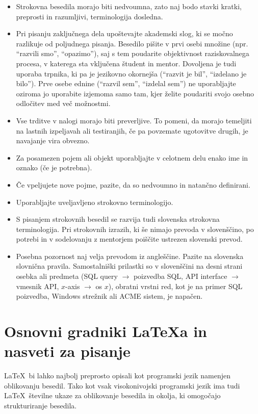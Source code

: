 \documentclass[a4paper,12pt,openright]{book}
\begin{document}
\begin{itemize}
    \item Strokovna besedila morajo biti nedvoumna, zato naj bodo stavki kratki, preprosti in razumljivi, terminologija dosledna. 
    \item Pri pisanju zaključnega dela upoštevajte akademski slog, ki se močno razlikuje od poljudnega pisanja. Besedilo pišite v prvi osebi množine (npr. \enquote{razvili smo}, \enquote{opazimo}), saj s tem poudarite objektivnost raziskovalnega procesa, v katerega sta vključena študent in mentor. Dovoljena je tudi uporaba trpnika, ki pa je jezikovno okornejša (\enquote{razvit je bil}, \enquote{izdelano je bilo}). Prve osebe ednine (\enquote{razvil sem}, \enquote{izdelal sem}) ne uporabljajte oziroma jo uporabite izjemoma samo tam, kjer želite poudariti svojo osebno odločitev med več možnostmi. 
    \item Vse trditve v nalogi morajo biti preverljive. To pomeni, da morajo temeljiti na lastnih izpeljavah ali testiranjih, če pa povzemate ugotovitve drugih, je navajanje vira obvezno.
    \item Za posamezen pojem ali objekt uporabljajte v celotnem delu enako ime in oznako (če je potrebna). 
    \item Če vpeljujete nove pojme, pazite, da so nedvoumno in natančno definirani. 
    \item Uporabljajte uveljavljeno strokovno terminologijo. 
    \item S pisanjem strokovnih besedil se razvija tudi slovenska strokovna terminologija. Pri strokovnih izrazih, ki še nimajo prevoda v slovenščino, po potrebi in v sodelovanju z mentorjem poiščite ustrezen slovenski prevod. 
    \item Posebna pozornost naj velja prevodom iz angleščine. Pazite na slovenska slovnična pravila. Samostalniški prilastki so v slovenščini na desni strani osebka ali predmeta (SQL query $\rightarrow$ poizvedba SQL, API interface $\rightarrow$ vmesnik API, $x$-axis $\rightarrow$ os $x$), obratni vrstni red, kot je na primer SQL poizvedba, Windows strežnik ali ACME sistem, je napačen.
\end{itemize}

\chapter{Osnovni gradniki \LaTeX{a} in nasveti za pisanje}
\label{ch:osnove}

\LaTeX\ bi lahko najbolj preprosto opisali kot programski jezik namenjen oblikovanju besedil.
Tako kot vsak visokonivojski programski jezik ima tudi \LaTeX\  številne ukaze za oblikovanje  besedila in okolja, ki omogočajo strukturiranje besedila.
\end{document}
